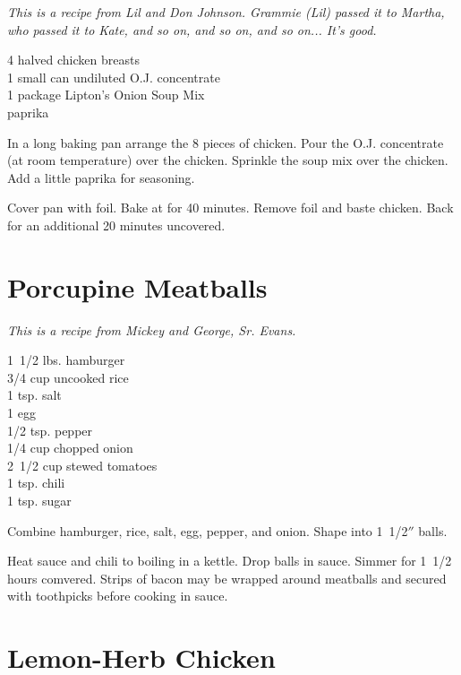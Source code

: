\textit{This is a  recipe from Lil and Don Johnson.  Grammie (Lil) passed
it to Martha, who passed it to Kate, and so on, and so on, and so
on... It's good.}
\begin{ingredients}
4 halved chicken breasts \\
1 small can undiluted O.J. concentrate \\
1 package Lipton's Onion Soup Mix \\
paprika
\end{ingredients}
In a long baking pan arrange the 8 pieces of chicken.  Pour the O.J.
concentrate (at room temperature) over the chicken.  Sprinkle the soup mix over
the chicken.  Add a little paprika for seasoning.

Cover pan with foil.  Bake at  for 40 minutes.  Remove foil and baste
chicken.  Back for an additional 20 minutes uncovered.

\section{Porcupine Meatballs}

\textit{This is a recipe from Mickey and George, Sr. Evans.}
\begin{ingredients}
1\ 1/2 lbs. hamburger \\
3/4 cup uncooked rice \\
1 tsp. salt \\
1 egg \\
1/2 tsp. pepper \\
1/4 cup chopped onion \\
2\ 1/2 cup stewed tomatoes \\
1 tsp. chili \\
1 tsp. sugar
\end{ingredients}
Combine hamburger, rice, salt, egg, pepper, and onion.  Shape into 1\ 1/2$''$
balls.

Heat sauce and chili to boiling in a kettle.  Drop balls in sauce.  Simmer for
1\ 1/2 hours comvered.  Strips of bacon may be wrapped around meatballs and
secured with toothpicks before cooking in sauce.

\section{Lemon-Herb Chicken}

